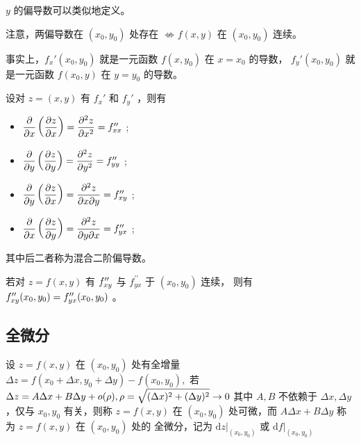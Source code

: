 $ y $ 的偏导数可以类似地定义。

注意，两偏导数在 $ (x_0,y_0) $ 处存在 $ \not\Leftrightarrow f(x,y) $ 在 $ (x_0,y_0) $ 连续。

事实上，$ f_x'(x_0,y_0) $ 就是一元函数 $ f(x,y_0) $ 在 $ x = x_0 $ 的导数，
$ f_y'(x_0,y_0) $ 就是一元函数 $ f(x_0,y) $ 在 $ y = y_0 $ 的导数。

\begin{Def}[高阶偏导数]

    设对 $ z = (x,y) $ 有 $ f_x' $ 和 $ f_y' $ ，则有
    \begin{itemize}
        \item $ \dfrac{\partial }{\partial x}\left(\dfrac{\partial z}{\partial x}\right) 
        = \dfrac{\partial^2 z}{\partial x^2} = f^{\prime\prime}_{xx} $ ;
        \item $ \dfrac{\partial }{\partial y}\left(\dfrac{\partial z}{\partial y}\right) 
        = \dfrac{\partial^2 z}{\partial y^2} = f^{\prime\prime}_{yy} $ ;
        \item $ \dfrac{\partial }{\partial y}\left(\dfrac{\partial z}{\partial x}\right) 
        = \dfrac{\partial^2 z}{\partial x\partial y} = f^{\prime\prime}_{xy} $ ;
        \item $ \dfrac{\partial }{\partial x}\left(\dfrac{\partial z}{\partial y}\right) 
        = \dfrac{\partial^2 z}{\partial y\partial x} = f^{\prime\prime}_{yx} $ ;
    \end{itemize}
    其中后二者称为混合二阶偏导数。
\end{Def}

\begin{Theo}[二阶混合偏导数相等的充分条件]

    若对 $ z = f(x,y) $ 有 $ f^{\prime\prime}_{xy} $ 与 $ f^{\prime\prime}_{yx} $ 于 $ (x_0,y_0) $ 连续，
    则有 $ f^{\prime\prime}_{xy}(x_0,y_0) = f^{\prime\prime}_{yx}(x_0,y_0) $ 。
\end{Theo}

\subsection{全微分}

\begin{Def}[全微分]

    设 $ z = f(x,y) $ 在 $ (x_0,y_0) $ 处有全增量 
    $ \Delta z = f(x_0+\Delta x,y_0 + \Delta y) - f(x_0,y_0), $ 
    若 $ \Delta z = A\Delta x + B\Delta y + o(\rho),\rho = \displaystyle\sqrt{(\Delta x)^2+(\Delta y)^2}\rightarrow0 $ 
    其中 $ A,B $ 不依赖于 $ \Delta x,\Delta y $ ，仅与 $ x_0,y_0 $ 有关，则称 $ z = f(x,y) $ 
    在 $ (x_0,y_0) $ 处可微，而 $ A\Delta x+B\Delta y $ 称为 $ z = f(x,y) $ 在 $ (x_0,y_0) $ 处的
    全微分，记为 $ \mathrm{d}z\big|_{(x_0,y_0)} $ 或 $ \mathrm{d}f\big|_{(x_0,y_0)} $
\end{Def}


